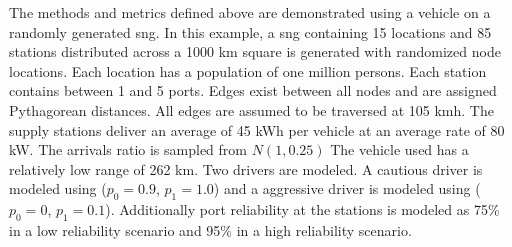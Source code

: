 \documentclass[11pt]{article}
\begin{document}
\begin{multicols}{2}
The methods and metrics defined above are demonstrated using a vehicle on a randomly generated \gls{sng}. In this example, a \gls{sng} containing 15 locations and 85 stations distributed across a 1000 km square is generated with randomized node locations. Each location has a population of one million persons. Each station contains between 1 and 5 ports. Edges exist between all nodes and are assigned Pythagorean distances. All edges are assumed to be traversed at 105 kmh. The supply stations deliver an average of 45 kWh per vehicle at an average rate of 80 kW. The arrivals ratio is sampled from $N(1, 0.25)$ The vehicle used has a relatively low range of 262 km. Two drivers are modeled. A cautious driver is modeled using ($p_0 = 0.9$, $p_1 = 1.0$) and a aggressive driver is modeled using ($p_0 = 0$, $p_1 = 0.1$). Additionally port reliability at the stations is modeled as 75\% in a low reliability scenario and 95\% in a high reliability scenario.


\end{multicols}
\end{document}
